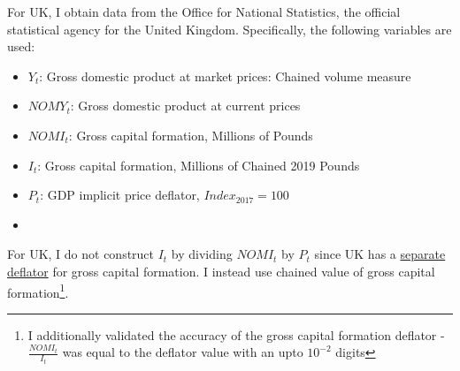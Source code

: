 \documentclass[11pt]{article}
\theoremstyle{mytheoremstyle}
\theoremstyle{mytheoremstyle}
\theoremstyle{myproblemstyle}
\begin{document}
For UK, I obtain data from the Office for National Statistics, the official statistical agency for the United Kingdom. Specifically, the following variables are used: 

\begin{itemize}
    \item $Y_t$: Gross domestic product at market prices: Chained volume measure
    \item $NOMY_t$:  Gross domestic product at current prices
    \item $NOMI_t$: Gross capital formation, Millions of Pounds
    \item $I_t$: Gross capital formation, Millions of Chained 2019 Pounds
    \item $P_t$: GDP implicit price deflator, $Index_{2017} = 100$
    \item 
\end{itemize}

For UK, I do not construct $I_t$ by dividing $NOMI_t$ by $P_t$ since UK has a \href{https://www.ons.gov.uk/economy/grossdomesticproductgdp/timeseries/ybfu/ukea}{separate deflator} for gross capital formation. I instead use chained value of gross capital formation\footnote{I additionally validated the accuracy of the gross capital formation deflator - $\frac{NOMI_t}{I_t}$ was equal to the deflator value with an upto $10^{-2}$ digits}.
\end{document}
